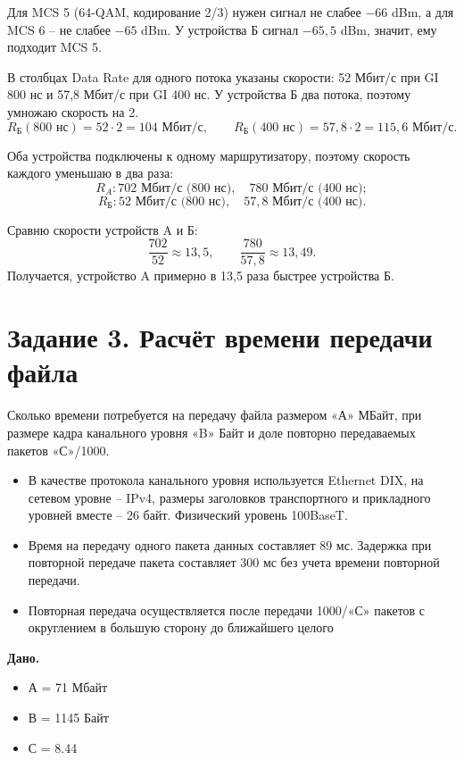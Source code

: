 \documentclass[a4paper, final]{article}
\begin{document}
Для MCS 5 (64-QAM, кодирование 2/3) нужен сигнал не слабее $-66$ dBm, а для MCS 6 -- не слабее $-65$ dBm. У устройства Б сигнал $-65{,}5$ dBm, значит, ему подходит MCS 5.

В столбцах Data Rate для одного потока указаны скорости: 52 Мбит/с при GI 800 нс и 57,8 Мбит/с при GI 400 нс. У устройства Б два потока, поэтому умножаю скорость на 2.
\[
R_{\text{Б}}(800\text{ нс})=52\cdot2=104\text{ Мбит/с},\qquad
R_{\text{Б}}(400\text{ нс})=57{,}8\cdot2=115{,}6\text{ Мбит/с}.
\]

Оба устройства подключены к одному маршрутизатору, поэтому скорость каждого уменьшаю в два раза:
\[
R_A: 702\text{ Мбит/с (800 нс)},\quad 780\text{ Мбит/с (400 нс)};
\]
\[
R_{\text{Б}}: 52\text{ Мбит/с (800 нс)},\quad 57{,}8\text{ Мбит/с (400 нс)}.
\]

Сравню скорости устройств A и Б:
\[
\frac{702}{52}\approx13{,}5,\qquad \frac{780}{57{,}8}\approx13{,}49.
\]
Получается, устройство A примерно в 13,5 раза быстрее устройства Б.

\newpage

\section{Задание 3. Расчёт времени передачи файла}

Сколько времени потребуется на передачу файла размером «А» МБайт, при размере кадра канального уровня «B» Байт и доле повторно передаваемых пакетов «С»/1000.

\begin{itemize}
	\item В качестве протокола канального уровня используется Ethernet DIX, на сетевом уровне – IPv4, размеры заголовков транспортного и прикладного уровней вместе – 26 байт. Физический уровень 100BaseT.
	\item Время на передачу одного пакета данных составляет 89 мс. Задержка при повторной передаче пакета составляет 300 мс без учета времени повторной передачи.
	\item Повторная передача осуществляется после передачи 1000/«С» пакетов с округлением в большую сторону до ближайшего целого
\end{itemize}

\textbf{Дано.} 
\begin{itemize}
	\item А = 71 Мбайт
	\item В = 1145 Байт
	\item С = 8.44
\end{itemize}
\end{document}
